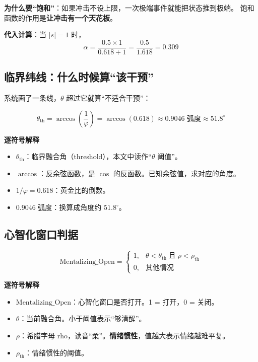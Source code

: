\documentclass[UTF8,a4paper,11pt]{ctexart}
\newenvironment{explainbox}[1]
{\begin{center}\begin{minipage}{0.94\textwidth}\colorbox{boxbg}{\parbox{0.92\textwidth}{\textbf{#1}\par\vspace{2pt}}}}
{\end{minipage}\end{center}}
\newcommand{\hl}[1]{\textcolor{blue!70!black}{\textbf{#1}}}
\begin{document}
\textbf{为什么要“饱和”}：如果冲击不设上限，一次极端事件就能把状态推到极端。
饱和函数的作用是\hl{让冲击有一个天花板}。

\textbf{代入计算}：当 $|s| = 1$ 时，
\begin{equation}
\alpha = \frac{0.5 \times 1}{0.618 + 1} = \frac{0.5}{1.618} = 0.309
\end{equation}

\subsection{临界纬线：什么时候算“该干预”}

系统画了一条线，$\theta$ 超过它就算“不适合干预”：

\begin{equation}
\theta_{\text{th}} = \arccos\!\left(\frac{1}{\varphi}\right) = \arccos(0.618) \approx 0.9046 \text{ 弧度} \approx 51.8^\circ
\label{p1:eq:theta-th}
\end{equation}

\begin{explainbox}{逐符号解释}
\begin{itemize}[leftmargin=1.4em,itemsep=1pt]
\item $\theta_{\text{th}}$：临界融合角（threshold），本文中读作“$\theta$ 阈值”。
\item $\arccos$：反余弦函数，是 $\cos$ 的反函数。已知余弦值，求对应的角度。
\item $1/\varphi = 0.618$：黄金比的倒数。
\item $0.9046$ 弧度：换算成角度约 $51.8^\circ$。
\end{itemize}
\end{explainbox}

\subsection{心智化窗口判据}

\begin{equation}
\text{Mentalizing\_Open} =
\begin{cases}
1, & \theta < \theta_{\text{th}} \;\text{且}\; \rho < \rho_{\text{th}} \\[4pt]
0, & \text{其他情况}
\end{cases}
\label{p1:eq:window}
\end{equation}

\begin{explainbox}{逐符号解释}
\begin{itemize}[leftmargin=1.4em,itemsep=1pt]
\item $\text{Mentalizing\_Open}$：心智化窗口是否打开。1 = 打开，0 = 关闭。
\item $\theta$：当前融合角。小于阈值表示“够清醒”。
\item $\rho$：希腊字母 rho，读音“柔”。\hl{情绪惯性}，值越大表示情绪越难平复。
\item $\rho_{\text{th}}$：情绪惯性的阈值。
\end{itemize}
\end{explainbox}
\end{document}
